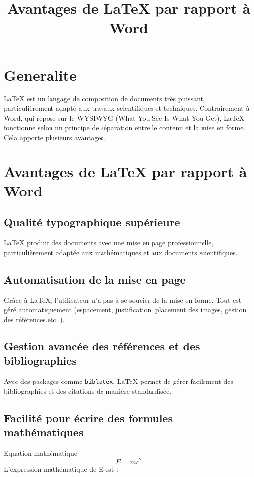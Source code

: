 \documentclass[a4paper,12pt]{article} %
\begin{document}
\title{Avantages de \LaTeX{} par rapport à Word}
\maketitle %

\section{Generalite} %
\LaTeX{} est un langage de composition de documents très puissant, 
particulièrement adapté aux travaux scientifiques et techniques. 
Contrairement à Word, qui repose sur le WYSIWYG (What You See Is What You Get), 
\LaTeX{} fonctionne selon un principe de séparation entre le contenu et la mise en forme. 
Cela apporte plusieurs avantages.

\section{Avantages de \LaTeX{} par rapport à Word}

\subsection{Qualité typographique supérieure} %
\LaTeX{} produit des documents avec une mise en page professionnelle, 
particulièrement adaptée aux mathématiques et aux documents scientifiques.

\subsection{Automatisation de la mise en page}
Grâce à \LaTeX{}, l’utilisateur n’a pas à se soucier de la mise en forme. 
Tout est géré automatiquement (espacement, justification, placement des images, gestion des références.etc..).

\subsection{Gestion avancée des références et des bibliographies}
Avec des packages comme \texttt{biblatex}, \LaTeX{} permet de gérer facilement 
des bibliographies et des citations de manière standardisée.

\subsection{Facilité pour écrire des formules mathématiques}
Equation mathématique
\begin{equation}
    E = mc^2
\end{equation}
L'expression mathématique de E est :
\end{document}
